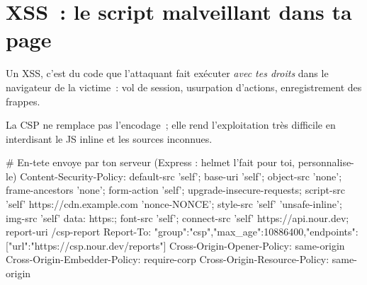 \section{XSS~: le script malveillant dans ta page}

Un XSS, c'est du code que l'attaquant fait ex\'ecuter \emph{avec tes droits} dans le navigateur de
la victime~: vol de session, usurpation d'actions, enregistrement des frappes.


La CSP ne remplace pas l'encodage~; elle rend l'exploitation tr\`es difficile en interdisant
le JS inline et les sources inconnues.

\begin{codeconf}
# En-tete envoye par ton serveur (Express : helmet l'fait pour toi, personnalise-le)
Content-Security-Policy: default-src 'self'; base-uri 'self'; object-src 'none';
  frame-ancestors 'none'; form-action 'self'; upgrade-insecure-requests;
  script-src 'self' https://cdn.example.com 'nonce-{NONCE}';
  style-src 'self' 'unsafe-inline'; img-src 'self' data: https:; font-src 'self';
  connect-src 'self' https://api.nour.dev; report-uri /csp-report
Report-To: {"group":"csp","max_age":10886400,"endpoints":[{"url":"https://csp.nour.dev/reports"}]}
Cross-Origin-Opener-Policy: same-origin
Cross-Origin-Embedder-Policy: require-corp
Cross-Origin-Resource-Policy: same-origin
\end{codeconf}

